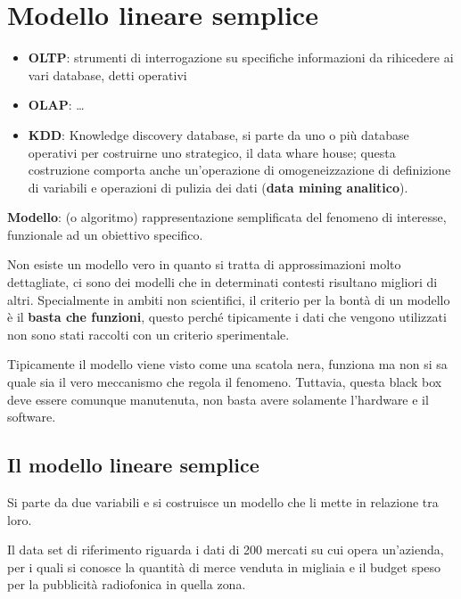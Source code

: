 \chapter{Modello lineare semplice}\label{lezione-3---modello-lineare-semplice}

\begin{itemize}
\item
  \textbf{OLTP}: strumenti di interrogazione su specifiche informazioni
  da rihicedere ai vari database, detti operativi
\item
  \textbf{OLAP}: \ldots{}
\item
  \textbf{KDD}: Knowledge discovery database, si parte da uno o più
  database operativi per costruirne uno strategico, il data whare house;
  questa costruzione comporta anche un'operazione di omogeneizzazione di
  definizione di variabili e operazioni di pulizia dei dati (\textbf{data
  mining analitico}).
\end{itemize}



\textbf{Modello}: (o algoritmo) rappresentazione semplificata del
fenomeno di interesse, funzionale ad un obiettivo specifico.

Non esiste un modello vero in quanto si tratta di approssimazioni molto
dettagliate, ci sono dei modelli che in determinati contesti risultano
migliori di altri. Specialmente in ambiti non scientifici, il criterio
per la bontà di un modello è il \textbf{basta che funzioni}, questo
perché tipicamente i dati che vengono utilizzati non sono stati raccolti
con un criterio sperimentale.

Tipicamente il modello viene visto come una scatola nera, funziona ma
non si sa quale sia il vero meccanismo che regola il fenomeno. Tuttavia,
questa black box deve essere comunque manutenuta, non basta avere
solamente l'hardware e il software.

\section{Il modello lineare semplice}\label{il-modello-lineare-semplice}

Si parte da due variabili e si costruisce un modello che li mette in
relazione tra loro.

Il data set di riferimento riguarda i dati di 200 mercati su cui opera
un'azienda, per i quali si conosce la quantità di merce venduta in
migliaia e il budget speso per la pubblicità radiofonica in quella
zona.

